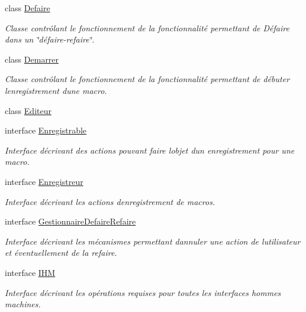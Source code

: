\begin{DoxyCompactItemize}
class \hyperlink{classfr_1_1istic_1_1m1_1_1aco_1_1miniediteur_1_1v1_1_1Defaire}{Defaire}
\begin{DoxyCompactList}\small\item\em Classe contrôlant le fonctionnement de la fonctionnalité permettant de Défaire dans un \char`\"{}défaire-\/refaire\char`\"{}. \end{DoxyCompactList}\item 
class \hyperlink{classfr_1_1istic_1_1m1_1_1aco_1_1miniediteur_1_1v1_1_1Demarrer}{Demarrer}
\begin{DoxyCompactList}\small\item\em Classe contrôlant le fonctionnement de la fonctionnalité permettant de débuter l\textquotesingle{}enregistrement d\textquotesingle{}une macro. \end{DoxyCompactList}\item 
class \hyperlink{classfr_1_1istic_1_1m1_1_1aco_1_1miniediteur_1_1v1_1_1Editeur}{Editeur}
\item 
interface \hyperlink{interfacefr_1_1istic_1_1m1_1_1aco_1_1miniediteur_1_1v1_1_1Enregistrable}{Enregistrable}
\begin{DoxyCompactList}\small\item\em Interface décrivant des actions pouvant faire l\textquotesingle{}objet d\textquotesingle{}un enregistrement pour une macro. \end{DoxyCompactList}\item 
interface \hyperlink{interfacefr_1_1istic_1_1m1_1_1aco_1_1miniediteur_1_1v1_1_1Enregistreur}{Enregistreur}
\begin{DoxyCompactList}\small\item\em Interface décrivant les actions d\textquotesingle{}enregistrement de macros. \end{DoxyCompactList}\item 
interface \hyperlink{interfacefr_1_1istic_1_1m1_1_1aco_1_1miniediteur_1_1v1_1_1GestionnaireDefaireRefaire}{Gestionnaire\+Defaire\+Refaire}
\begin{DoxyCompactList}\small\item\em Interface décrivant les mécanismes permettant d\textquotesingle{}annuler une action de l\textquotesingle{}utilisateur et éventuellement de la refaire. \end{DoxyCompactList}\item 
interface \hyperlink{interfacefr_1_1istic_1_1m1_1_1aco_1_1miniediteur_1_1v1_1_1IHM}{I\+HM}
\begin{DoxyCompactList}\small\item\em Interface décrivant les opérations requises pour toutes les interfaces hommes machines. \end{DoxyCompactList}\item 

\end{DoxyCompactItemize}
